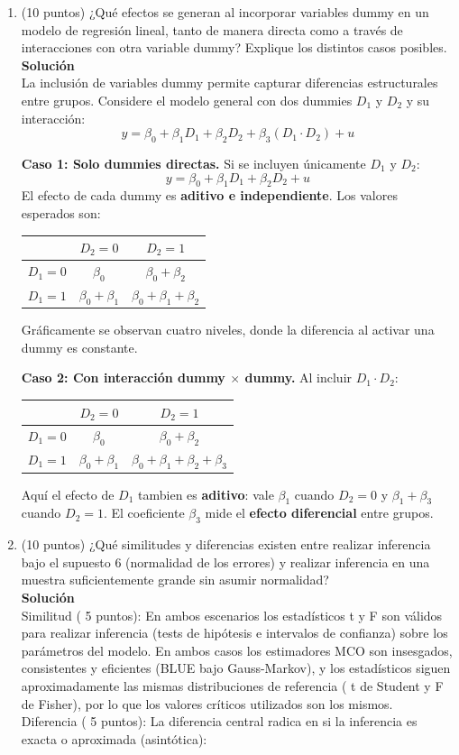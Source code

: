 \documentclass[10pt,a4paper]{article}
\begin{document}
\begin{enumerate}
    \item  (10 puntos) ¿Qué efectos se generan al incorporar variables dummy en un modelo de regresión lineal, tanto de manera directa como a través de interacciones con otra variable dummy? 
Explique los distintos casos posibles.
\\
\textbf{Solución}
\\
La inclusión de variables dummy permite capturar diferencias estructurales entre grupos. Considere el modelo general con dos dummies $D_1$ y $D_2$ y su interacción:
\[
y = \beta_0 + \beta_1 D_1 + \beta_2 D_2 + \beta_3 (D_1 \cdot D_2) + u
\]

\textbf{Caso 1: Solo dummies directas.} Si se incluyen únicamente $D_1$ y $D_2$:
\[
y = \beta_0 + \beta_1 D_1 + \beta_2 D_2 + u
\]
El efecto de cada dummy es \textbf{aditivo e independiente}. Los valores esperados son:
\begin{center}
\begin{tabular}{c|cc}
 & $D_2 = 0$ & $D_2 = 1$ \\ \hline
$D_1 = 0$ & $\beta_0$ & $\beta_0 + \beta_2$ \\
$D_1 = 1$ & $\beta_0 + \beta_1$ & $\beta_0 + \beta_1 + \beta_2$
\end{tabular}
\end{center}
Gráficamente se observan cuatro niveles, donde la diferencia al activar una dummy es constante.

\textbf{Caso 2: Con interacción dummy $\times$ dummy.} Al incluir $D_1 \cdot D_2$:
\begin{center}
\begin{tabular}{c|cc}
 & $D_2 = 0$ & $D_2 = 1$ \\ \hline
$D_1 = 0$ & $\beta_0$ & $\beta_0 + \beta_2$ \\
$D_1 = 1$ & $\beta_0 + \beta_1$ & $\beta_0 + \beta_1 + \beta_2 + \beta_3$
\end{tabular}
\end{center}
Aquí el efecto de $D_1$ tambien es \textbf{aditivo}: vale $\beta_1$ cuando $D_2=0$ y $\beta_1 + \beta_3$ cuando $D_2=1$. El coeficiente $\beta_3$ mide el \textbf{efecto diferencial} entre grupos.


    \item (10 puntos) ¿Qué similitudes y diferencias existen entre realizar inferencia bajo el supuesto 6 (normalidad de los errores) y realizar inferencia en una muestra suficientemente grande sin asumir normalidad?
\\
\textbf{Solución}
\\
Similitud ( 5 puntos):
En ambos escenarios los estadísticos
t y F son válidos para realizar inferencia (tests de hipótesis e intervalos de confianza) sobre los parámetros del modelo. En ambos casos los estimadores MCO son insesgados, consistentes y eficientes (BLUE bajo Gauss-Markov), y los estadísticos siguen aproximadamente las mismas distribuciones de referencia (
t de Student y
F de Fisher), por lo que los valores críticos utilizados son los mismos. \\
Diferencia ( 5 puntos):
La diferencia central radica en si la inferencia es exacta o aproximada (asintótica):


\end{enumerate}
\end{document}

